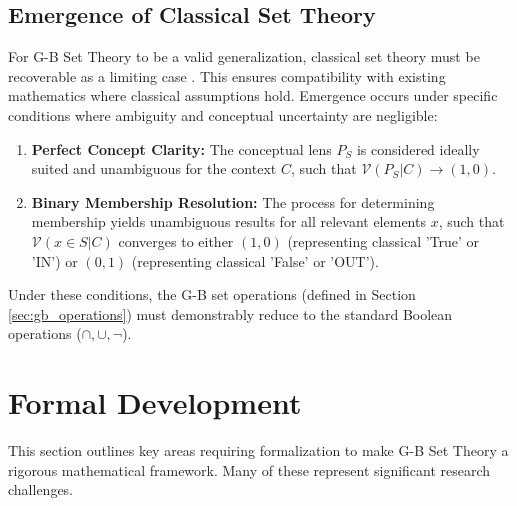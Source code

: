 \documentclass[11pt]{article}
\newcommand{\gbval}[1]{\mathcal{V}(#1)}         %
\newcommand{\pset}[1]{P_{#1}}                   %
\theoremstyle{definition}
\theoremstyle{plain}
\begin{document}
\subsection{Emergence of Classical Set Theory} \label{sec:classical_emergence}
For G-B Set Theory to be a valid generalization, classical set theory must be recoverable as a limiting case \cite{gb_set_theory_outline}. This ensures compatibility with existing mathematics where classical assumptions hold. Emergence occurs under specific conditions where ambiguity and conceptual uncertainty are negligible:

\begin{enumerate}
    \item \textbf{Perfect Concept Clarity:} The conceptual lens $\pset{S}$ is considered ideally suited and unambiguous for the context $C$, such that $\gbval{\pset{S}|C} \to (1, 0)$.
    \item \textbf{Binary Membership Resolution:} The process for determining membership yields unambiguous results for all relevant elements $x$, such that $\gbval{x \in S|C}$ converges to either $(1, 0)$ (representing classical 'True' or 'IN') or $(0, 1)$ (representing classical 'False' or 'OUT').
\end{enumerate}
Under these conditions, the G-B set operations (defined in Section \ref{sec:gb_operations}) must demonstrably reduce to the standard Boolean operations ($\cap, \cup, \neg$).

\section{Formal Development} \label{sec:formal_dev}
This section outlines key areas requiring formalization to make G-B Set Theory a rigorous mathematical framework. Many of these represent significant research challenges.
\end{document}
